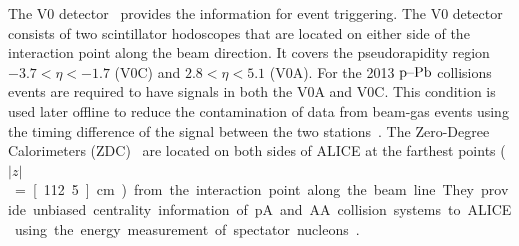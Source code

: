The V0 detector~\cite{forwarddetectorsTdr} provides the information for event triggering. The V0 detector consists of two scintillator hodoscopes that are located on either side of the interaction point along the beam direction. It covers the pseudorapidity region $-3.7 < \eta < -1.7$ (V0C) and $2.8 < \eta < 5.1$ (V0A). For the 2013 $\mbox{p--Pb}$ collisions events are required to have signals in both the V0A and V0C. This condition is used later offline to reduce the contamination of data from beam-gas events using the timing difference of the signal between the two stations~\cite{alicePerformance}.
The Zero-Degree Calorimeters (ZDC)~\cite{PUDDU2007397} are located on both sides of ALICE at the farthest points ($|z|$~=~\unit[112.5]{cm}) from the interaction point along the beam line. They provide unbiased centrality information of pA and AA collision systems to ALICE using the energy measurement of spectator nucleons~\cite{Adam:2014qja,Abelev:2013qoq}.



